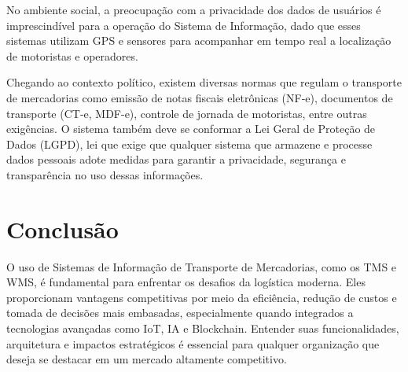 \documentclass[conference]{IEEEtran}
\begin{document}
No ambiente social, a preocupação com a privacidade dos dados de usuários é imprescindível para a operação do Sistema de Informação, dado que esses sistemas utilizam GPS e sensores para acompanhar em tempo real a localização de motoristas e operadores.

Chegando ao contexto político, existem diversas normas que regulam o transporte de mercadorias como emissão de notas fiscais eletrônicas (NF-e), documentos de transporte (CT-e, MDF-e), controle de jornada de motoristas, entre outras exigências. O sistema também deve se conformar a Lei Geral de Proteção de Dados (LGPD), lei que exige que qualquer sistema que armazene e processe dados pessoais adote medidas para garantir a privacidade, segurança e transparência no uso dessas informações.
\section{Conclusão}
O uso de Sistemas de Informação de Transporte de Mercadorias, como os TMS e WMS, é fundamental para enfrentar os desafios da logística moderna. Eles proporcionam vantagens competitivas por meio da eficiência, redução de custos e tomada de decisões mais embasadas, especialmente quando integrados a tecnologias avançadas como IoT, IA e Blockchain. Entender suas funcionalidades, arquitetura e impactos estratégicos é essencial para qualquer organização que deseja se destacar em um mercado altamente competitivo.
\nocite{*}


\end{document}
